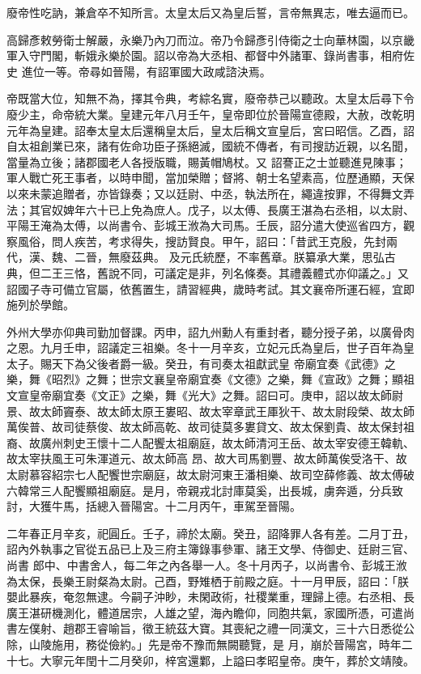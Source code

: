 \begin{pinyinscope}
 廢帝性吃訥，兼倉卒不知所言。太皇太后又為皇后誓，言帝無異志，唯去逼而已。



 高歸彥敕勞衛士解嚴，永樂乃內刀而泣。帝乃令歸彥引侍衛之士向華林園，以京畿軍入守門閣，斬娥永樂於園。詔以帝為大丞相、都督中外諸軍、錄尚書事，相府佐史
 進位一等。帝尋如晉陽，有詔軍國大政咸諮決焉。



 帝既當大位，知無不為，擇其令典，考綜名實，廢帝恭己以聽政。太皇太后尋下令廢少主，命帝統大業。皇建元年八月壬午，皇帝即位於晉陽宣德殿，大赦，改乾明元年為皇建。詔奉太皇太后還稱皇太后，皇太后稱文宣皇后，宮曰昭信。乙酉，詔自太祖創業已來，諸有佐命功臣子孫絕滅，國統不傳者，有司搜訪近親，以名聞，當量為立後；諸郡國老人各授版職，賜黃帽鳩杖。又
 詔謇正之士並聽進見陳事；軍人戰亡死王事者，以時申聞，當加榮贈；督將、朝士名望素高，位歷通顯，天保以來未蒙追贈者，亦皆錄奏；又以廷尉、中丞，執法所在，繩違按罪，不得舞文弄法；其官奴婢年六十已上免為庶人。戊子，以太傅、長廣王湛為右丞相，以太尉、平陽王淹為太傅，以尚書令、彭城王浟為大司馬。壬辰，詔分遣大使巡省四方，觀察風俗，問人疾苦，考求得失，搜訪賢良。甲午，詔曰：「昔武王克殷，先封兩代，漢、魏、二晉，無廢茲典。
 及元氏統歷，不率舊章。朕纂承大業，思弘古典，但二王三恪，舊說不同，可議定是非，列名條奏。其禮義體式亦仰議之。」又詔國子寺可備立官屬，依舊置生，請習經典，歲時考試。其文襄帝所運石經，宜即施列於學館。



 外州大學亦仰典司勤加督課。丙申，詔九州勳人有重封者，聽分授子弟，以廣骨肉之恩。九月壬申，詔議定三祖樂。冬十一月辛亥，立妃元氏為皇后，世子百年為皇太子。賜天下為父後者爵一級。癸丑，有司奏太祖獻武皇
 帝廟宜奏《武德》之樂，舞《昭烈》之舞；世宗文襄皇帝廟宜奏《文德》之樂，舞《宣政》之舞；顯祖文宣皇帝廟宜奏《文正》之樂，舞《光大》之舞。詔曰可。庚申，詔以故太師尉景、故太師竇泰、故太師太原王婁昭、故太宰章武王厙狄干、故太尉段榮、故太師萬俟普、故司徒蔡俊、故太師高乾、故司徒莫多婁貸文、故太保劉貴、故太保封祖裔、故廣州刺史王懷十二人配饗太祖廟庭，故太師清河王岳、故太宰安德王韓軌、故太宰扶風王可朱渾道元、故太師高
 昂、故大司馬劉豐、故太師萬俟受洛干、故太尉慕容紹宗七人配饗世宗廟庭，故太尉河東王潘相樂、故司空薛修義、故太傅破六韓常三人配饗顯祖廟庭。是月，帝親戎北討庫莫奚，出長城，虜奔遁，分兵致討，大獲牛馬，括總入晉陽宮。十二月丙午，車駕至晉陽。



 二年春正月辛亥，祀圓丘。壬子，禘於太廟。癸丑，詔降罪人各有差。二月丁丑，詔內外執事之官從五品已上及三府主簿錄事參軍、諸王文學、侍御史、廷尉三官、尚書
 郎中、中書舍人，每二年之內各舉一人。冬十月丙子，以尚書令、彭城王浟為太保，長樂王尉粲為太尉。己酉，野雉栖于前殿之庭。十一月甲辰，詔曰：「朕嬰此暴疾，奄忽無逮。今嗣子沖眇，未閑政術，社稷業重，理歸上德。右丞相、長廣王湛研機測化，體道居宗，人雄之望，海內瞻仰，同胞共氣，家國所憑，可遣尚書左僕射、趙郡王睿喻旨，徵王統茲大寶。其喪紀之禮一同漢文，三十六日悉從公除，山陵施用，務從儉約。」先是帝不豫而無闕聽覽，是
 月，崩於晉陽宮，時年二十七。大寧元年閏十二月癸卯，梓宮還鄴，上謚曰孝昭皇帝。庚午，葬於文靖陵。




\end{pinyinscope}
